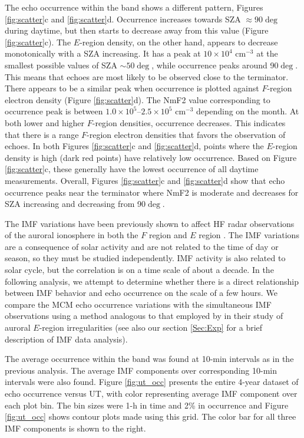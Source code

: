 The echo occurrence within the band shows a different pattern, Figures \ref{fig:scatter}c and \ref{fig:scatter}d. Occurrence increases towards SZA \(\approx90\deg\) during daytime, but then starts to decrease away from this value (Figure \ref{fig:scatter}c). The $E$-region density, on the other hand, appears to decrease monotonically with a SZA increasing. It has a peak at \(10 \times 10^4\) cm\(^{-3}\) at the smallest possible values of SZA \(\sim50\deg\), while occurrence peaks around 90\(\deg\). This means that echoes are most likely to be observed close to the terminator. There appears to be a similar peak when occurrence is plotted against \(F\)-region electron density (Figure \ref{fig:scatter}d). The NmF2 value corresponding to occurrence peak is between \(1.0\times 10^5\)--\(2.5\times 10^5\) cm\(^{-3}\) depending on the month.  At both lower and higher \(F\)-region densities, occurrence decreases. This indicates that there is a range \(F\)-region electron densities that favors the observation of echoes. In both Figures \ref{fig:scatter}c and \ref{fig:scatter}d, points where the \(E\)-region density is high (dark red points) have relatively low occurrence.  Based on Figure \ref{fig:scatter}c, these generally have the lowest occurrence of all daytime measurements.  Overall, Figures \ref{fig:scatter}c and \ref{fig:scatter}d show that echo occurrence peaks near the terminator where NmF2 is moderate and decreases for SZA increasing and decreasing from 90\(\deg\).

The IMF variations have been previously shown to affect HF radar observations of the auroral ionosphere in both the \(F\) region \citep{Ballatore2001} and \(E\) region \citep{Makarevich2012}. The IMF variations are a consequence of solar activity and are not related to the time of day or season, so they must be studied independently. IMF activity is also related to solar cycle, but the correlation is on a time scale of about a decade. In the following analysis, we attempt to determine whether there is a direct relationship between IMF behavior and echo occurrence on the scale of a few hours. We compare the MCM echo occurrence variations with the simultaneous IMF observations using a method analogous to that employed by \citet{Makarevich2012} in their study of auroral \(E\)-region irregularities (see also our section \ref{Sec:Exp} for a brief description of IMF data analysis).

The average occurrence within the band was found at 10-min intervals as in the previous analysis. The average IMF components over corresponding 10-min intervals were also found. Figure \ref{fig:ut_occ} presents the entire 4-year dataset of echo occurrence versus UT, with color representing average IMF component over each plot bin. The bin sizes were 1-h in time and 2\% in occurrence and Figure \ref{fig:ut_occ} shows contour plots made using this grid. The color bar for all three IMF components is shown to the right.

